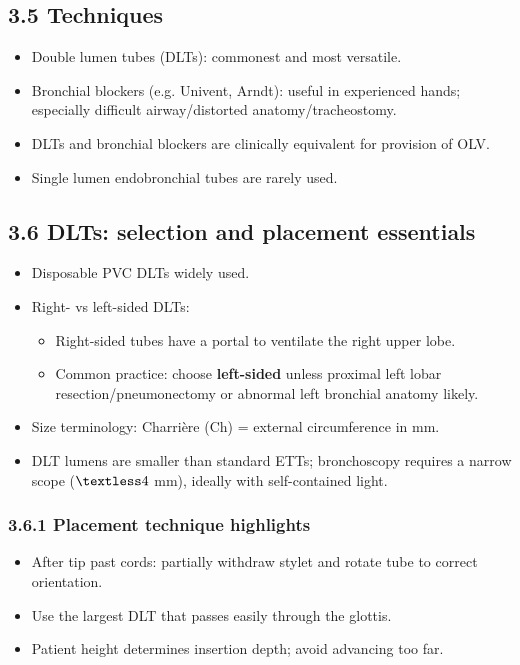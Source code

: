 \documentclass[11pt,a4paper]{article}
\begin{document}
\subsection{3.5 Techniques}
\begin{itemize}[leftmargin=*, itemsep=2pt]
  \item Double lumen tubes (DLTs): commonest and most versatile.
  \item Bronchial blockers (e.g. Univent, Arndt): useful in experienced hands; especially difficult airway/distorted anatomy/tracheostomy.
  \item DLTs and bronchial blockers are clinically equivalent for provision of OLV.
  \item Single lumen endobronchial tubes are rarely used.
\end{itemize}

\subsection{3.6 DLTs: selection and placement essentials}
\begin{itemize}[leftmargin=*, itemsep=2pt]
  \item Disposable PVC DLTs widely used.
  \item Right- vs left-sided DLTs:
  \begin{itemize}[leftmargin=*, itemsep=2pt]
    \item Right-sided tubes have a portal to ventilate the right upper lobe.
    \item Common practice: choose \textbf{left-sided} unless proximal left lobar resection/pneumonectomy or abnormal left bronchial anatomy likely.
  \end{itemize}
  \item Size terminology: Charri\`ere (Ch) = external circumference in mm.
  \item DLT lumens are smaller than standard ETTs; bronchoscopy requires a narrow scope (\(\textless 4\) mm), ideally with self-contained light.
\end{itemize}

\subsubsection{3.6.1 Placement technique highlights}
\begin{itemize}[leftmargin=*, itemsep=2pt]
  \item After tip past cords: partially withdraw stylet and rotate tube to correct orientation.
  \item Use the largest DLT that passes easily through the glottis.
  \item Patient height determines insertion depth; avoid advancing too far.
\end{itemize}
\end{document}
